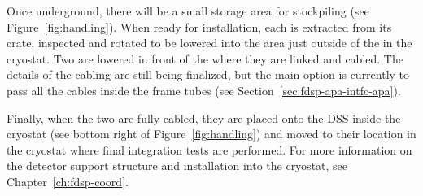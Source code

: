 Once underground, there will be a small storage area for stockpiling  (see Figure~\ref{fig:handling}). When ready for installation, each  is extracted from its crate, inspected and rotated to be lowered into the area just outside of the  in the cryostat. Two  are lowered in front of the  where they are linked and cabled. The details of the cabling are still being finalized, but the main option is currently to pass all the cables inside the  frame tubes (see Section~\ref{sec:fdsp-apa-intfc-apa}).



Finally, when the two  are fully cabled, they are placed onto the DSS inside the cryostat (see bottom right of Figure~\ref{fig:handling}) and moved to their location in the cryostat where final integration tests are performed.  For more information on the detector support structure and installation into the cryostat, see %
Chapter~\ref{ch:fdsp-coord}. 

